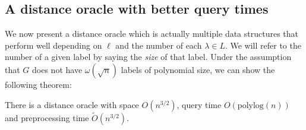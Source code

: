 \subsection{A distance oracle with better query times}\label{oracle2}
We now present a distance oracle which is actually multiple data structures that perform
well depending on $\ell$ and the number of each $\lambda\in L$. We will refer to the
number of a given label by saying the \textit{size} of that label. 
Under the assumption that $G$ does not have $\omega(\sqrt{n})$ labels of polynomial size, we can show the following theorem:
\begin{thm}\label{thm2}
  There is a distance oracle with space $O(n^{3/2})$, query time $O(\text{polylog}(n))$ and
  preprocessing time $\tilde{O}(n^{3/2})$.
\end{thm}


